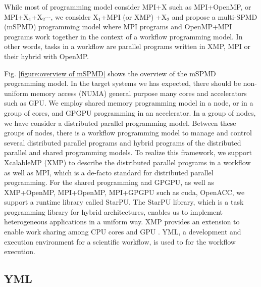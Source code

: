 \documentclass[graybox]{svmult}
\begin{document}
While most of programming model consider MPI+X such as MPI+OpenMP,  or MPI+X$_{1}$+X$_{2}\cdots $, we consider X$_{1}$+MPI (or XMP) +X$_{2}$ and propose a multi-SPMD (mSPMD) programming model where MPI programs and OpenMP+MPI programs work together in the context of a workflow programming model. In other words, tasks in a workflow are parallel programs written in XMP, MPI or their hybrid with OpenMP. 

Fig. \ref{figure:overview of mSPMD} shows the overview of the mSPMD programming model. 
In the target systems we has expected, there should be non-uniform memory access (NUMA) general purpose many cores and accelerators such as GPU. 
We  employ shared memory programming model in a node, or in a group of cores, and GPGPU programming in an accelerator. In a group of nodes, we have consider a distributed parallel programming model. Between these groups of nodes, there is a workflow programming model to manage and control several distributed parallel programs and hybrid programs of the distributed parallel and shared programming models.
To realize this framework, we support XcalableMP (XMP) to describe the distributed parallel programs in a workflow as well as MPI, which is a de-facto standard for distributed parallel programming.
For the shared programming and GPGPU, as well as XMP+OpenMP, MPI+OpenMP, MPI+GPGPU such as cuda, OpenACC, we support a runtime library called StarPU. The StarPU library\cite{Augonnet2011starpu}, which is a task programming library for hybrid architectures, enables us to implement heterogeneous applications in a uniform way. 
XMP provides an extension to enable work sharing among CPU cores and GPU \cite{odajima2013Adaptive}.
YML\cite{delannoy2004a, delannoy2006a, delannoy2006b}, a development and execution environment for a scientific workflow, is used to for the workflow execution. 

\subsection{YML}
\end{document}
